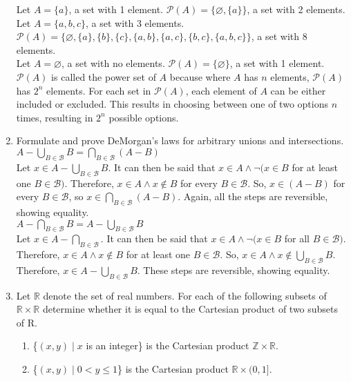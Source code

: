\documentclass{article}
\begin{document}
\begin{enumerate}
            Let $A = \{a\}$, a set with 1 element. $\mathcal{P}(A) = \{\varnothing, \{a\}\}$, a set with 2 elements.\\
            Let $A = \{a, b, c\}$, a set with 3 elements. $\mathcal{P}(A) = \{\varnothing, \{a\}, \{b\}, \{c\}, \{a, b\}, \{a, c\}, \{b, c\}, \{a, b, c\}\}$, a set with 8 elements.\\
            Let $A = \varnothing$, a set with no elements. $\mathcal{P}(A) = \{\varnothing\}$, a set with 1 element.\\
            $\mathcal{P}(A)$ is called the power set of $A$ because where $A$ has $n$ elements, $\mathcal{P}(A)$ has $2^{n}$ elements. For each set in $\mathcal{P}(A)$, each element of $A$ can be either included or excluded. This results in choosing between one of two options $n$ times, resulting in $2^{n}$ possible options.
      \item Formulate and prove DeMorgan's laws for arbitrary unions and intersections.\\
            $A - \bigcup_{B \in \mathcal{B}} B = \bigcap_{B \in \mathcal{B}}(A - B)$\\
            Let $x \in A - \bigcup_{B \in \mathcal{B}} B$. It can then be said that $x \in A \land \neg (x \in B$ for at least one $B \in \mathcal{B})$. Therefore, $x \in A \land x \notin B$ for every $B \in \mathcal{B}$. So, $x \in (A - B)$ for every $B \in \mathcal{B}$, so $x \in \bigcap_{B \in \mathcal{B}}(A - B)$. Again, all the steps are reversible, showing equality. \\
            $A - \bigcap_{B \in \mathcal{B}} B = A - \bigcup_{B \in \mathcal{B}} B$\\
            Let $x \in A - \bigcap_{B \in \mathcal{B}}$. It can then be said that $x \in A \land \neg(x \in B$ for all $B \in \mathcal{B})$. Therefore, $x \in A \land x \notin B$ for at least one $B \in \mathcal{B}$. So, $x \in A \land x \notin \bigcup_{B \in \mathcal{B}} B$. Therefore, $x \in A - \bigcup_{B \in \mathcal{B}} B$. These steps are reversible, showing equality.
      \item Let $\mathbb{R}$ denote the set of real numbers. For each of the following subsets of $\mathbb{R} \times \mathbb{R}$ determine whether it is equal to the Cartesian product of two subsets of R.
      \begin{enumerate}
            \item \{$(x, y) \mid x$ is an integer\} is the Cartesian product $\mathbb{Z} \times \mathbb{R}$.
            \item \{$(x, y) \mid 0 < y \leq 1$\} is the Cartesian product $\mathbb{R} \times (0, 1]$.

\end{enumerate}
\end{enumerate}
\end{document}
